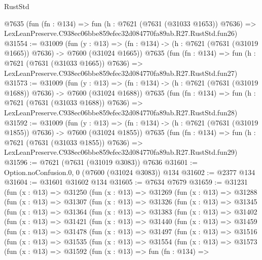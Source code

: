 \begin{lexlean}{RustStd}
\begin{coremodule}
    @7635
    (fun (fn : @134) =>
    fun (h : @7621 (@7631 (@31033 @1653)) @7636) =>
    LexLeanPreserve.C938ec06bbe859efec32d084770fa89ab.R27.RustStd.fun26)
@31554 := @31009
    (fun (y : @13) =>
    (fn : @134) -> (h : @7621 (@7631 (@31019 @1665)) @7636) -> @7600 (@31024 @1665))
    @7635
    (fun (fn : @134) =>
    fun (h : @7621 (@7631 (@31033 @1665)) @7636) =>
    LexLeanPreserve.C938ec06bbe859efec32d084770fa89ab.R27.RustStd.fun27)
@31573 := @31009
    (fun (y : @13) =>
    (fn : @134) -> (h : @7621 (@7631 (@31019 @1688)) @7636) -> @7600 (@31024 @1688))
    @7635
    (fun (fn : @134) =>
    fun (h : @7621 (@7631 (@31033 @1688)) @7636) =>
    LexLeanPreserve.C938ec06bbe859efec32d084770fa89ab.R27.RustStd.fun28)
@31592 := @31009
    (fun (y : @13) =>
    (fn : @134) -> (h : @7621 (@7631 (@31019 @1855)) @7636) -> @7600 (@31024 @1855))
    @7635
    (fun (fn : @134) =>
    fun (h : @7621 (@7631 (@31033 @1855)) @7636) =>
    LexLeanPreserve.C938ec06bbe859efec32d084770fa89ab.R27.RustStd.fun29)
@31596 := @7621 (@7631 (@31019 @3083)) @7636
@31601 := Option.noConfusion.{0, 0} (@7600 (@31024 @3083)) @134
@31602 := @2377 @134
@31604 := @31601 @31602 @134
@31605 := @7634 @7679
@31659 := @31231
    (fun (x : @13) =>
    @31250
      (fun (x : @13) =>
      @31269
        (fun (x : @13) =>
        @31288
          (fun (x : @13) =>
          @31307
            (fun (x : @13) =>
            @31326
              (fun (x : @13) =>
              @31345
                (fun (x : @13) =>
                @31364
                  (fun (x : @13) =>
                  @31383
                    (fun (x : @13) =>
                    @31402
                      (fun (x : @13) =>
                      @31421
                        (fun (x : @13) =>
                        @31440
                          (fun (x : @13) =>
                          @31459
                            (fun (x : @13) =>
                            @31478
                              (fun (x : @13) =>
                              @31497
                                (fun (x : @13) =>
                                @31516
                                  (fun (x : @13) =>
                                  @31535
                                    (fun (x : @13) =>
                                    @31554
                                      (fun (x : @13) =>
                                      @31573
                                        (fun (x : @13) =>
                                        @31592
                                          (fun (x : @13) =>
                                          fun (fn : @134) =>

\end{coremodule}
\end{lexlean}

